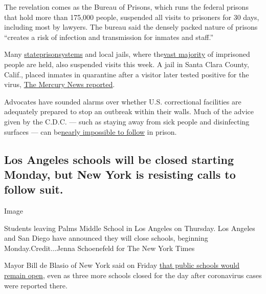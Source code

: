 The revelation comes as the Bureau of Prisons, which runs the federal
prisons that hold more than 175,000 people, suspended all visits to
prisoners for 30 days, including most by lawyers. The bureau said the
densely packed nature of prisons ``creates a risk of infection and
transmission for inmates and staff.''

Many
\href{https://www.texastribune.org/2020/03/13/texas-prisons-cancel-visitation-coronavirus/}{state}\href{https://www.doc.wa.gov/information/alerts.htm\#prison-alerts}{prison}\href{https://www.charlotteobserver.com/news/local/article241173191.html}{systems}
and local jails, where
the\href{https://www.bjs.gov/content/pub/pdf/p17.pdf}{vast majority} of
imprisoned people are held, also suspended visits this week. A jail in
Santa Clara County, Calif., placed inmates in quarantine after a visitor
later tested positive for the virus,
\href{https://www.mercurynews.com/2020/03/13/coronavirus-inmates-quarantined-at-santa-clara-county-jail-after-defense-attorney-tests-positive/}{The
Mercury News reported}.

Advocates have sounded alarms over whether U.S. correctional facilities
are adequately prepared to stop an outbreak within their walls. Much of
the advice given by the C.D.C. --- such as staying away from sick people
and disinfecting surfaces --- can
be\href{https://www.usatoday.com/story/news/investigations/2020/03/07/prison-policies-inmates-best-coronavirus-practices/4978412002/}{nearly
impossible to follow} in prison.

\hypertarget{los-angeles-schools-will-be-closed-starting-monday-but-new-york-is-resisting-calls-to-follow-suit}{%
\subsection{Los Angeles schools will be closed starting Monday, but New
York is resisting calls to follow
suit.}\label{los-angeles-schools-will-be-closed-starting-monday-but-new-york-is-resisting-calls-to-follow-suit}}

Image

Students leaving Palms Middle School in Los Angeles on Thursday. Los
Angeles and San Diego have announced they will close schools, beginning
Monday.Credit...Jenna Schoenefeld for The New York Times

Mayor Bill de Blasio of New York said on Friday
\href{https://www.nytimes3xbfgragh.onion/2020/03/13/nyregion/coronavirus-nyc-schools.html}{that
public schools would remain open}, even as three more schools closed for
the day after coronavirus cases were reported there.

